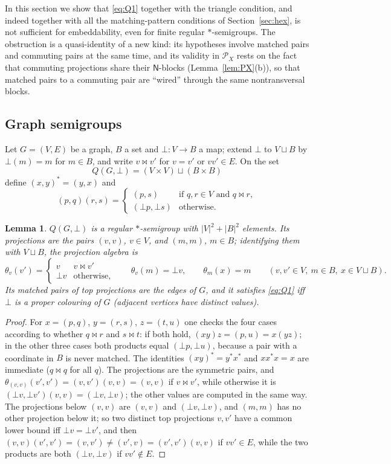 \documentclass[11pt]{amsart}
\newtheorem{lemma}[theorem]{Lemma}
\theoremstyle{definition}
\renewcommand{\P}{\mathcal{P}}
\newcommand{\N}{\mathsf{N}}
\begin{document}
In this section we show that \eqref{eq:Q1} together with the triangle condition, and indeed together with all the matching-pattern conditions of Section~\ref{sec:hex}, is not sufficient for embeddability, even for finite regular $*$-semigroups. The obstruction is a quasi-identity of a new kind: its hypotheses involve matched pairs and commuting pairs at the same time, and its validity in $\P_X$ rests on the fact that commuting projections share their $\N$-blocks (Lemma~\ref{lem:PX}(b)), so that matched pairs to a commuting pair are ``wired'' through the same nontransversal blocks.

\subsection{Graph semigroups}\label{subsec:graphsg}

Let $G=(V,E)$ be a graph, $B$ a set and $\bot\colon V\to B$ a map; extend $\bot$ to $V\sqcup B$ by $\bot(m)=m$ for $m\in B$, and write $v\bowtie v'$ for $v=v'$ or $vv'\in E$. On the set
\[
Q(G,\bot)=(V\times V)\sqcup(B\times B)
\]
define $(x,y)^*=(y,x)$ and
\[
(p,q)(r,s)=\begin{cases}(p,s)&\text{if }q,r\in V\text{ and }q\bowtie r,\\ (\bot p,\bot s)&\text{otherwise.}\end{cases}
\]

\begin{lemma}\label{lem:graphsg}
$Q(G,\bot)$ is a regular $*$-semigroup with $|V|^2+|B|^2$ elements. Its projections are the pairs $(v,v)$, $v\in V$, and $(m,m)$, $m\in B$; identifying them with $V\sqcup B$, the projection algebra is
\[
\theta_v(v')=\begin{cases}v&v\bowtie v'\\ \bot v&\text{otherwise,}\end{cases}\qquad \theta_v(m)=\bot v,\qquad \theta_m(x)=m\qquad(v,v'\in V,\ m\in B,\ x\in V\sqcup B).
\]
Its matched pairs of top projections are the edges of $G$, and it satisfies \eqref{eq:Q1} iff $\bot$ is a proper colouring of $G$ (adjacent vertices have distinct values).
\end{lemma}
\begin{proof}
For $x=(p,q)$, $y=(r,s)$, $z=(t,u)$ one checks the four cases according to whether $q\bowtie r$ and $s\bowtie t$: if both hold, $(xy)z=(p,u)=x(yz)$; in the other three cases both products equal $(\bot p,\bot u)$, because a pair with a coordinate in $B$ is never matched. The identities $(xy)^*=y^*x^*$ and $xx^*x=x$ are immediate ($q\bowtie q$ for all $q$). The projections are the symmetric pairs, and $\theta_{(v,v)}(v',v')=(v,v')(v,v)=(v,v)$ if $v\bowtie v'$, while otherwise it is $(\bot v,\bot v')(v,v)=(\bot v,\bot v)$; the other values are computed in the same way. The projections below $(v,v)$ are $(v,v)$ and $(\bot v,\bot v)$, and $(m,m)$ has no other projection below it; so two distinct top projections $v,v'$ have a common lower bound iff $\bot v=\bot v'$, and then $(v,v)(v',v')=(v,v')\ne(v',v)=(v',v')(v,v)$ if $vv'\in E$, while the two products are both $(\bot v,\bot v)$ if $vv'\notin E$.
\end{proof}
\end{document}
